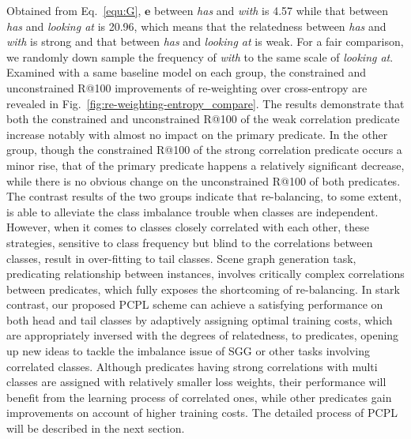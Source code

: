 \documentclass[sigconf]{acmart}
\begin{document}
Obtained from Eq.~\ref{equ:G}, $\textbf{e}$ between \emph{has} and \emph{with} is 4.57 while that between \emph{has} and \emph{looking at} is 20.96, which means that the relatedness between \emph{has} and \emph{with} is strong and that between \emph{has} and \emph{looking at} is weak. For a fair comparison, we randomly down sample the frequency of \emph{with} to the same scale of \emph{looking at}.
\\\indent Examined with a same baseline model on each group, the constrained and unconstrained R@100 improvements of re-weighting over cross-entropy are revealed in Fig.~\ref{fig:re-weighting-entropy_compare}. The results demonstrate that both the constrained and unconstrained R@100 of the weak correlation predicate increase notably with almost no impact on the primary predicate. In the other group, though the constrained R@100 of the strong correlation predicate occurs a minor rise, that of the primary predicate happens a relatively significant decrease, while there is no obvious change on the unconstrained R@100 of both predicates. The contrast results of the two groups indicate that re-balancing, to some extent, is able to alleviate the class imbalance trouble when classes are independent. However, when it comes to classes closely correlated with each other, these strategies, sensitive to class frequency but blind to the correlations between classes, result in over-fitting to tail classes. Scene graph generation task, predicating relationship between instances, involves critically complex correlations between predicates, which fully exposes the shortcoming of re-balancing. In stark contrast, our proposed PCPL scheme can achieve a satisfying performance on both head and tail classes by adaptively assigning optimal training costs, which are appropriately inversed with the degrees of relatedness, to predicates, opening up new ideas to tackle the imbalance issue of SGG or other tasks involving correlated classes. Although predicates having strong correlations with multi classes are assigned with relatively smaller loss weights, their performance will benefit from the learning process of correlated ones, while other predicates gain improvements on account of higher training costs. The detailed process of PCPL will be described in the next section. 
\end{document}
